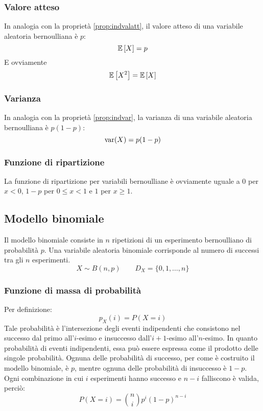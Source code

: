 \subsubsection{Valore atteso}
In analogia con la proprietà \ref{prop:indvalatt}, il valore atteso di una variabile aleatoria bernoulliana è $p$:
\begin{equation*}
	\mathbb{E}\left[ X \right] = p
\end{equation*}
E ovviamente
\begin{equation*}
	\mathbb{E}\left[ X^2 \right]=\mathbb{E}\left[ X \right]
\end{equation*}


\subsubsection{Varianza}
In analogia con la proprietà \ref{prop:indvar}, la varianza di una variabile aleatoria bernoulliana è $p(1-p)$:
\begin{equation*}
	\operatorname{var}(X) = p(1-p)
\end{equation*}


\subsubsection{Funzione di ripartizione}
La funzione di ripartizione per variabili bernoulliane è ovviamente uguale a $0$ per $x<0$, $1-p$ per $0\leq x<1$ e $1$ per $x\geq 1$.



\subsection{Modello binomiale}
Il modello binomiale consiste in $n$ ripetizioni di un esperimento bernoulliano di probabilità $p$. Una variabile aleatoria binomiale corrisponde al numero di successi tra gli $n$ esperimenti.
\begin{equation*}
	X \sim B(n, p)\qquad D_X=\{0,1,\dots,n\}
\end{equation*}


\subsubsection{Funzione di massa di probabilità}
Per definizione:
\begin{equation*}
	p_X(i) = P(X=i)
\end{equation*}
Tale probabilità è l'intersezione degli eventi indipendenti che consistono nel successo dal primo all'$i$-esimo e insuccesso dall'$i+1$-esimo all'$n$-esimo. In quanto probabilità di eventi indipendenti, essa può essere espressa come il prodotto delle singole probabilità. Ognuna delle probabilità di successo, per come è costruito il modello binomiale, è $p$, mentre ognuna delle probabilità di insuccesso è $1-p$. Ogni combinazione in cui $i$ esperimenti hanno successo e $n-i$ falliscono è valida, perciò:
\begin{equation}
	P(X=i) = \binom{n}{i} p^i(1-p)^{n-i}
\end{equation}

